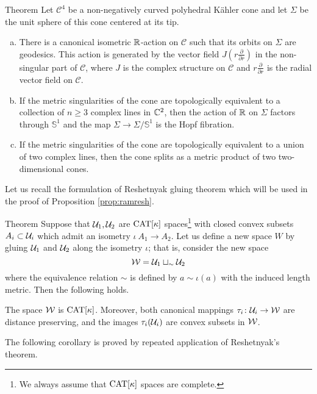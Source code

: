 \documentclass[oneside,a4paper]{article}
\begin{document}
\begin{thm}{Theorem}\label{allPK}
Let $\mathcal C^4$ be a non-negatively curved polyhedral K\"ahler cone and let $\Sigma$
be the unit sphere of this cone centered at its tip.

\begin{enumerate}[(a)]
\item There is a canonical isometric $\mathbb{R}$-action on $\mathcal C$
such that its orbits on $\Sigma$ are geodesics. This action is generated
by the vector field $J(r\frac{\partial}{\partial r})$ in the non-singular part
of $\mathcal C$, where $J$ is the complex structure on $\mathcal C$ and $r\frac{\partial}{\partial r}$
is the radial vector field on $\mathcal C$.
\item If the metric singularities of the cone are topologically equivalent to
a collection of $n\ge 3$ complex lines in $\mathbb{C}^2$, then the action
of $\mathbb{R}$ on $\Sigma$ factors through $\mathbb{S}^1$ and the map
$\Sigma\to \Sigma/\mathbb{S}^1$ is the Hopf fibration.
\item\label{allPK:3} If the metric singularities of the cone are topologically equivalent to
a union of two complex lines, then the cone splits as a metric product
of two two-dimensional cones.
\end{enumerate}
\end{thm}

Let us recall the formulation of Reshetnyak gluing theorem which will be used in the proof of  Proposition \ref{prop:ramresh}.

\begin{thm}{Theorem}\label{thm:gluing}
Suppose that
$\mathcal{U}_1, \mathcal{U}_2$ are $\mathrm{CAT}[\kappa]$ spaces\footnote{We always assume that $\mathrm{CAT}[\kappa]$ spaces are complete.} with
closed convex subsets $A_i\subset\mathcal{U}_i$
which admit an isometry $\iota\:A_1\to A_2$.
Let us define a new space $W$ by gluing 
$\mathcal{U}_1$ and  $\mathcal{U}_2$ along the isometry $\iota$;
that is,  consider the new space
\[\mathcal{W}=\mathcal{U}_1\sqcup_\sim\mathcal{U}_2\]
where the equivalence relation $\sim$ is defined by $a\sim \iota(a)$ with the induced length metric. Then the following holds.

The space $\mathcal{W}$ is $\mathrm{CAT}[\kappa]$.
Moreover, both canonical mappings
$\tau_i\colon\mathcal{U}_i\to\mathcal{W}$ are distance preserving,
and the images $\tau_i(\mathcal{U}_i)$ are convex subsets in $\mathcal{W}$.
\end{thm}

The following corollary is proved by repeated application of Reshetnyak's theorem.
\end{document}
